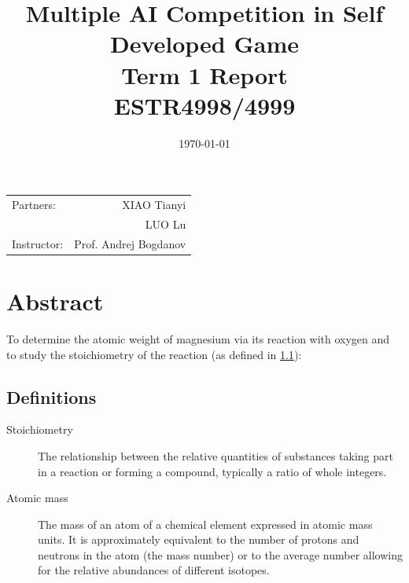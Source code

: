 \documentclass[14pt]{extarticle}
\title{\large Multiple AI Competition in Self Developed Game \\ Term 1 Report \\ ESTR4998/4999} %
\date{\today} %
\begin{document}
\maketitle %

\begin{center}
\begin{tabular}{l r}
Partners: & XIAO Tianyi \\ %
& LUO Lu \\
Instructor: & Prof. Andrej Bogdanov %
\end{tabular}
\end{center}
\newpage
\begin{abstract}
\end{abstract}


\section{Abstract}

To determine the atomic weight of magnesium via its reaction with oxygen and to study the stoichiometry of the reaction (as defined in \ref{definitions}):



\subsection{Definitions}
\label{definitions}
\begin{description}
\item[Stoichiometry]
The relationship between the relative quantities of substances taking part in a reaction or forming a compound, typically a ratio of whole integers.
\item[Atomic mass]
The mass of an atom of a chemical element expressed in atomic mass units. It is approximately equivalent to the number of protons and neutrons in the atom (the mass number) or to the average number allowing for the relative abundances of different isotopes. 
\end{description} 
 
\end{document}
